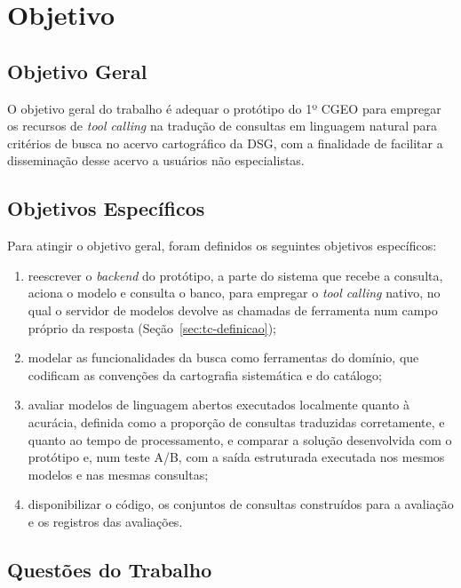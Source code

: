 \section{Objetivo}
\label{sec:objetivo}

\subsection{Objetivo Geral}
\label{sec:objetivo-geral}

O objetivo geral do trabalho é adequar o protótipo do 1º CGEO para empregar os recursos de \textit{tool calling} na tradução de consultas em linguagem natural para critérios de busca no acervo cartográfico da DSG, com a finalidade de facilitar a disseminação desse acervo a usuários não especialistas.

\subsection{Objetivos Específicos}
\label{sec:objetivos-especificos}

Para atingir o objetivo geral, foram definidos os seguintes objetivos específicos:
\begin{enumerate}
  \item reescrever o \textit{backend} do protótipo, a parte do sistema que recebe a consulta, aciona o modelo e consulta o banco, para empregar o \textit{tool calling} nativo, no qual o servidor de modelos devolve as chamadas de ferramenta num campo próprio da resposta (Seção~\ref{sec:tc-definicao});
  \item modelar as funcionalidades da busca como ferramentas do domínio, que codificam as convenções da cartografia sistemática e do catálogo;
  \item avaliar modelos de linguagem abertos executados localmente quanto à acurácia, definida como a proporção de consultas traduzidas corretamente, e quanto ao tempo de processamento, e comparar a solução desenvolvida com o protótipo e, num teste A/B, com a saída estruturada executada nos mesmos modelos e nas mesmas consultas;
  \item disponibilizar o código, os conjuntos de consultas construídos para a avaliação e os registros das avaliações.
\end{enumerate}

\subsection{Questões do Trabalho}
\label{sec:questoes}


